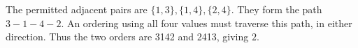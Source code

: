 The permitted adjacent pairs are $\{1,3\},\{1,4\},\{2,4\}$. They form the path $3-1-4-2$. An ordering using all four values must traverse this path, in either direction. Thus the two orders are 3142 and 2413, giving $\boxed2$.
